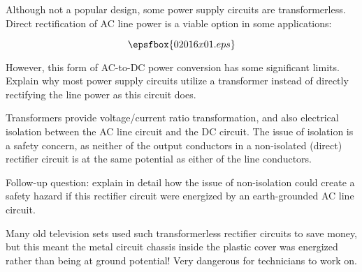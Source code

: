 

Although not a popular design, some power supply circuits are transformerless.  Direct rectification of AC line power is a viable option in some applications:

$$\epsfbox{02016x01.eps}$$

However, this form of AC-to-DC power conversion has some significant limits.  Explain why most power supply circuits utilize a transformer instead of directly rectifying the line power as this circuit does.







Transformers provide voltage/current ratio transformation, and also electrical isolation between the AC line circuit and the DC circuit.  The issue of isolation is a safety concern, as neither of the output conductors in a non-isolated (direct) rectifier circuit is at the same potential as either of the line conductors.  

\vskip 10pt

Follow-up question: explain in detail how the issue of non-isolation could create a safety hazard if this rectifier circuit were energized by an earth-grounded AC line circuit.







Many old television sets used such transformerless rectifier circuits to save money, but this meant the metal circuit chassis inside the plastic cover was energized rather than being at ground potential!  Very dangerous for technicians to work on.




